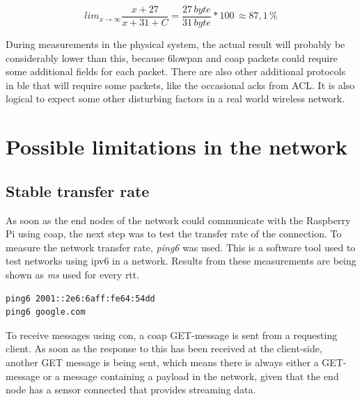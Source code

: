 \begin{equation} \label{percentageHeader}
    lim_{x\to\infty} \frac{x + 27}{x + 31 + C} = \frac{27 \, byte}{31 \, byte}*100 \, \approx 87,1 \,\%
\end{equation} 


\noindent During measurements in the physical system, the actual result will probably be considerably lower than this, because \gls{6lowpan} and \gls{coap} packets could require some additional fields for each packet. There are also other additional protocols in \gls{ble} that will require some packets, like the occasional \glspl{ack} from ACL. It is also logical to expect some other disturbing factors in a real world wireless network. 

\section{Possible limitations in the network}

\subsection{Stable transfer rate}

\noindent As soon as the end nodes of the network could communicate with the Raspberry Pi using \gls{coap}, the next step was to test the transfer rate of the connection. To measure the network transfer rate, \textit{ping6} was used. This is a software tool used to test networks using \gls{ipv6} in a network. Results from these measurements are being shown as \textit{ms} used for every \acrlong{rtt}. 

\begin{verbatim}
ping6 2001::2e6:6aff:fe64:54dd
ping6 google.com
\end{verbatim}



\noindent To receive messages using \gls{con}, a \gls{coap} GET-message is sent from a requesting client. As soon as the response to this has been received at the client-side, another GET message is being sent, which means there is always either a GET-message or a message containing a \gls{payload} in the network, given that the end node has a sensor connected that provides streaming data. 

